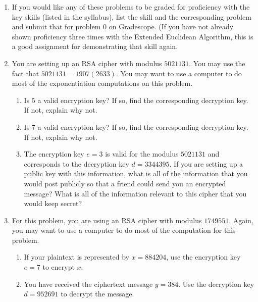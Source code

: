 \documentclass[12pt]{article}
\begin{document}
\begin{enumerate}
\item[0.] If you would like any of these problems to be graded for proficiency with the key skills (listed in the syllabus), list the skill and the corresponding problem and submit that for problem 0 on Gradescope.  (If you have not already shown proficiency three times with the Extended Euclidean Algorithm, this is a good assignment for demonstrating that skill again.

\item You are setting up an RSA cipher with modulus $5021131$.  You may use the fact that $5021131 = 1907(2633)$.  You may want to use a computer to do most of the exponentiation computations on this problem. 
\begin{enumerate}
\item Is $5$ a valid encryption key?  If so, find the corresponding decryption key.  If not, explain why not.

\item Is $7$ a valid encryption key?  If so, find the corresponding decryption key.  If not, explain why not.

\item The encryption key $e = 3$ is valid for the modulus $5021131$ and corresponds to the decryption key $d = 3344395$.  If you are setting up a public key with this information, what is all of the information that you would post publicly so that a friend could send you an encrypted message?  What is all of the information relevant to this cipher that you would keep secret?
\end{enumerate}



\item For this problem, you are using an RSA cipher with modulus $1749551$.  Again, you may want to use a computer to do most of the computation for this problem. \\
\begin{enumerate}
\item If your plaintext is represented by $x = 884204$, use the encryption key $e = 7$ to encrypt $x$.
\item You have received the ciphertext message $y = 384$.  Use the decryption key $d =952691$ to decrypt the message.  

\end{enumerate}




\end{enumerate}
\end{document}
